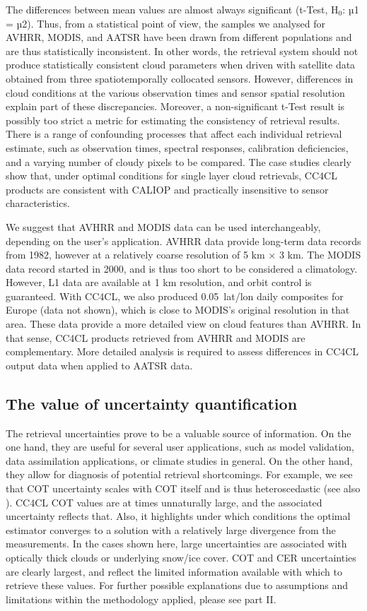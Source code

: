 The differences between mean values are almost always significant (t-Test, H$_0$: µ1 = µ2). Thus, from a statistical point of view, the samples we analysed for AVHRR, MODIS, and AATSR have been drawn from different populations and are thus statistically inconsistent. In other words, the retrieval system should not produce statistically consistent cloud parameters when driven with satellite data obtained from three spatiotemporally collocated sensors. However, differences in cloud conditions at the various observation times and sensor spatial resolution explain part of these discrepancies. Moreover, a non-significant t-Test result is possibly too strict a metric for estimating the consistency of retrieval results. There is a range of confounding processes that affect each individual retrieval estimate, such as observation times, spectral responses, calibration deficiencies, and a varying number of cloudy pixels to be compared. The case studies clearly show that, under optimal conditions for single layer cloud retrievals, CC4CL products are consistent with CALIOP and practically insensitive to sensor characteristics.

We suggest that AVHRR and MODIS data can be used interchangeably, depending on the user's application. AVHRR data provide long-term data records from 1982, however at a relatively coarse resolution of 5 km $\times$ 3 km. The MODIS data record started in 2000, and is thus too short to be considered a climatology. However, L1 data are available at 1 km resolution, and orbit control is guaranteed. With CC4CL, we also produced 0.05\textdegree\ lat/lon daily composites for Europe (data not shown), which is close to MODIS's original resolution in that area. These data provide a more detailed view on cloud features than AVHRR. In that sense, CC4CL products retrieved from AVHRR and MODIS are complementary. More detailed analysis is required to assess differences in CC4CL output data when applied to AATSR data.

\subsection{The value of uncertainty quantification}

The retrieval uncertainties prove to be a valuable source of information. On the one hand, they are useful for several user applications, such as model validation, data assimilation applications, or climate studies in general. On the other hand, they allow for diagnosis of potential retrieval shortcomings. For example, we see that COT uncertainty scales with COT itself and is thus heteroscedastic (see also \citet{Poulsen12}). CC4CL COT values are at times unnaturally large, and the associated uncertainty reflects that. Also, it highlights under which conditions the optimal estimator converges to a solution with a relatively large divergence from the measurements. In the cases shown here, large uncertainties are associated with optically thick clouds or underlying snow/ice cover. COT and CER uncertainties are clearly largest, and reflect the limited information available with which to retrieve these values. For further possible explanations due to assumptions and limitations within the methodology applied, please see part II.


